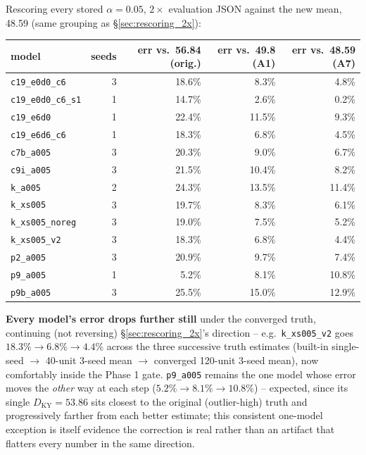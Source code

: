 \documentclass[11pt]{article}
\begin{document}
Rescoring every stored $\alpha{=}0.05$, $2\times$ evaluation JSON against
the new mean, 48.59 (same grouping as \S\ref{sec:rescoring_2x}):

\begin{center}
\begin{tabular}{lrrrr}
\toprule
model & seeds & err vs.\ 56.84 (orig.) & err vs.\ 49.8 (A1) & err vs.\ 48.59 (A7) \\
\midrule
\texttt{c19\_e0d0\_c6}      & 3 & 18.6\% & 8.3\%  & 4.8\%  \\
\texttt{c19\_e0d0\_c6\_s1}  & 1 & 14.7\% & 2.6\%  & 0.2\%  \\
\texttt{c19\_e6d0}          & 1 & 22.4\% & 11.5\% & 9.3\%  \\
\texttt{c19\_e6d6\_c6}      & 1 & 18.3\% & 6.8\%  & 4.5\%  \\
\texttt{c7b\_a005}          & 3 & 20.3\% & 9.0\%  & 6.7\%  \\
\texttt{c9i\_a005}          & 3 & 21.5\% & 10.4\% & 8.2\%  \\
\texttt{k\_a005}            & 2 & 24.3\% & 13.5\% & 11.4\% \\
\texttt{k\_xs005}           & 3 & 19.7\% & 8.3\%  & 6.1\%  \\
\texttt{k\_xs005\_noreg}    & 3 & 19.0\% & 7.5\%  & 5.2\%  \\
\texttt{k\_xs005\_v2}       & 3 & 18.3\% & 6.8\%  & 4.4\%  \\
\texttt{p2\_a005}           & 3 & 20.9\% & 9.7\%  & 7.4\%  \\
\texttt{p9\_a005}           & 1 & 5.2\%  & 8.1\%  & 10.8\% \\
\texttt{p9b\_a005}          & 3 & 25.5\% & 15.0\% & 12.9\% \\
\bottomrule
\end{tabular}
\end{center}

\textbf{Every model's error drops further still} under the converged
truth, continuing (not reversing) \S\ref{sec:rescoring_2x}'s direction --
e.g.\ \texttt{k\_xs005\_v2} goes $18.3\%\to6.8\%\to4.4\%$ across the
three successive truth estimates (built-in single-seed $\to$ 40-unit
3-seed mean $\to$ converged 120-unit 3-seed mean), now comfortably
inside the Phase 1 gate. \texttt{p9\_a005} remains the one model whose
error moves the \emph{other} way at each step ($5.2\%\to8.1\%\to10.8\%$)
-- expected, since its single $D_{\mathrm{KY}}{=}53.86$ sits closest to
the original (outlier-high) truth and progressively farther from each
better estimate; this consistent one-model exception is itself evidence
the correction is real rather than an artifact that flatters every
number in the same direction.
\end{document}
